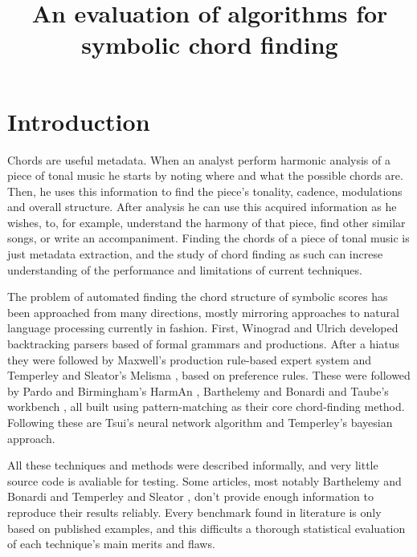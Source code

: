 \documentclass{article}
\title{An evaluation of algorithms for symbolic chord finding}
\begin{document}
\graphicspath{{figs/}{data/}}
\maketitle

\begin{abstract}
\end{abstract}

\section{Introduction}
\label{sec:introduction}

Chords are useful metadata. When an analyst perform harmonic analysis
of a piece of tonal music he starts by noting where and what the
possible chords are. Then, he uses this information to find the
piece's tonality, cadence, modulations and overall structure. After
analysis he can use this acquired information as he wishes, to, for
example, understand the harmony of that piece, find other similar
songs, or write an accompaniment. Finding the chords of a piece of
tonal music is just metadata extraction, and the study of chord
finding as such can increse understanding of the performance and
limitations of current techniques.

The problem of automated finding the chord structure of symbolic
scores has been approached from many directions, mostly mirroring
approaches to natural language processing currently in fashion.
First, Winograd \cite{winograd:linguistics} and Ulrich
\cite{ulrich:analysis} developed backtracking parsers based of formal
grammars and productions. After a hiatus they were followed by
Maxwell's \cite{maxwell:expert} production rule-based expert system
and Temperley and Sleator's Melisma \cite{temperley.ea:modeling},
based on preference rules. These were followed by Pardo and
Birmingham's HarmAn \cite{pardo.ea:automated}, Barthelemy and Bonardi
\cite{barthelemy.ea:figured} and Taube's workbench
\cite{taube:automatic}, all built using pattern-matching as their core
chord-finding method. Following these are Tsui's \cite{tsui:harmonic}
neural network algorithm and Temperley's \cite{temperley:bayesian}
bayesian approach.

All these techniques and methods were described informally, and very
little source code is avaliable for testing. Some articles, most
notably Barthelemy and Bonardi \cite{barthelemy.ea:figured} and
Temperley and Sleator \cite{temperley.ea:modeling}, don't provide
enough information to reproduce their results reliably. Every
benchmark found in literature \cite{pardo.ea:automated,
  barthelemy.ea:figured, tsui:harmonic, taube:automatic,
  illescas.ea:harmonic} is only based on published examples, and this
difficults a thorough statistical evaluation of each technique's main
merits and flaws.
\end{document}
